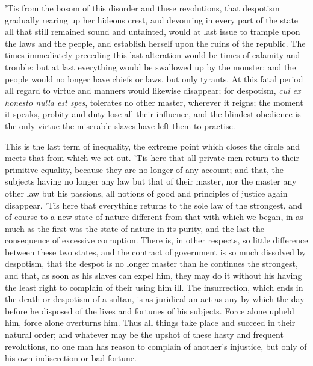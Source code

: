 \documentclass[11pt,twocolumn]{ltugboat}
\begin{document}
'Tis from the bosom of this disorder and these revolutions, that
despotism gradually rearing up her hideous crest, and devouring in
every part of the state all that still remained sound and untainted,
would at last issue to trample upon the laws and the people, and
establish herself upon the ruins of the republic. The times
immediately preceding this last alteration would be times of calamity
and trouble: but at last everything would be swallowed up by the
monster; and the people would no longer have chiefs or laws, but only
tyrants. At this fatal period all regard to virtue and manners would
likewise disappear; for despotism, \textit{cui ex honesto nulla est spes},
tolerates no other master, wherever it reigns; the moment it speaks,
probity and duty lose all their influence, and the blindest obedience
is the only virtue the miserable slaves have left them to practise.

This is the last term of inequality, the extreme point which closes
the circle and meets that from which we set out. 'Tis here that all
private men return to their primitive equality, because they are no
longer of any account; and that, the subjects having no longer any law
but that of their master, nor the master any other law but his
passions, all notions of good and principles of justice again
disappear. 'Tis here that everything returns to the sole law of the
strongest, and of course to a new state of nature different from that
with which we began, in as much as the first was the state of nature
in its purity, and the last the consequence of excessive corruption.
There is, in other respects, so little difference between these two
states, and the contract of government is so much dissolved by
despotism, that the despot is no longer master than he continues the
strongest, and that, as soon as his slaves can expel him, they may do
it without his having the least right to complain of their using him
ill. The insurrection, which ends in the death or despotism of a
sultan, is as juridical an act as any by which the day before he
disposed of the lives and fortunes of his subjects. Force alone upheld
him, force alone overturns him. Thus all things take place and succeed
in their natural order; and whatever may be the upshot of these hasty
and frequent revolutions, no one man has reason to complain of
another's injustice, but only of his own indiscretion or bad fortune.
\end{document}
